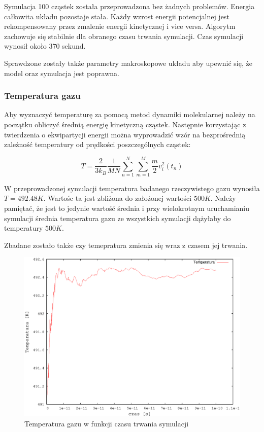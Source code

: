 \documentclass[a4paper,10pt]{article}
\begin{document}
Symulacja 100 cząstek została przeprowadzona bez żadnych problemów. Energia całkowita układu pozostaje stała. Każdy wzrost energii potencjalnej jest rekompensowany przez zmalenie energii kinetycznej i vice versa. Algorytm zachowuje się stabilnie dla obranego czasu trwania symulacji. Czas symulacji wynosił około $370$ sekund.

Sprawdzone zostały także parametry makroskopowe układu aby upewnić się, że model oraz symulacja jest poprawna.

\subsubsection{Temperatura gazu}

Aby wyznaczyć temperaturę za pomocą metod dynamiki molekularnej należy na początku obliczyć średnią energię kinetyczną cząstek. Następnie korzystając z twierdzenia o ekwipartycji energii można wyprowadzić wzór na bezprośrednią zależność temperatury od prędkości poszczególnych cząstek:

\begin{equation}\label{temp:1}
T = \frac{2}{3 k_B} \frac{1}{M N} \sum_{n=1}^{N} \sum_{m=1}^{M} \frac{m}{2} v_i^2(t_n)
\end{equation}

W przeprowadzonej symulacji temperatura badanego rzeczywistego gazu wynosiła $T=492.48K$.
Wartośc ta jest zbliżona do założonej wartości $500 K$. Należy pamiętać, że jest to jedynie wartość średnia i przy wielokrotnym uruchamianiu symulacji średnia temperatura gazu ze wszystkich symulacji dążyłaby do temperatury $500 K$.

Zbadane zostało także czy temepratura zmienia się wraz z czasem jej trwania.

\begin{figure}[h]
\begin{center}
\includegraphics[scale=0.6]{wyniki/simulation-temp.eps}
\caption{Temperatura gazu w funkcji czasu trwania symulacji}
\label{pic:simulation}
\end{center}
\end{figure}
\FloatBarrier
\end{document}
